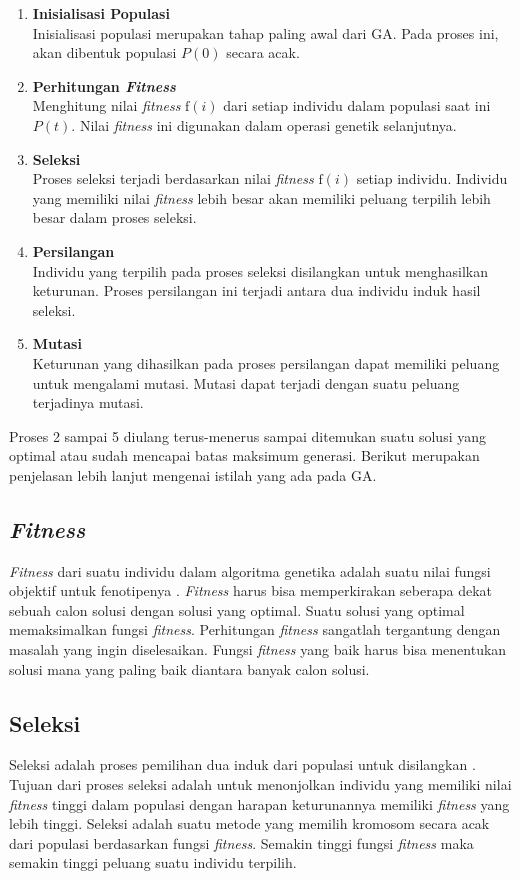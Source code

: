 \begin{enumerate}
	\item \textbf{Inisialisasi Populasi} \\
	Inisialisasi populasi merupakan tahap paling awal dari GA. Pada proses ini, akan dibentuk populasi $P(0)$ secara acak. 
	\item \textbf{Perhitungan \textit{Fitness}} \\
	Menghitung nilai \textit{fitness} $\textrm{f}(i)$ dari setiap individu dalam populasi saat ini $P(t)$. Nilai \textit{fitness} ini digunakan dalam operasi genetik selanjutnya.
	\item \textbf{Seleksi} \\
	Proses seleksi terjadi berdasarkan nilai \textit{fitness} $\textrm{f}(i)$ setiap individu. Individu yang memiliki nilai \textit{fitness} lebih besar akan memiliki peluang terpilih lebih besar dalam proses seleksi.
	\item \textbf{Persilangan} \\
	Individu yang terpilih pada proses seleksi disilangkan untuk menghasilkan keturunan. Proses persilangan ini terjadi antara dua individu induk hasil seleksi.
	\item \textbf{Mutasi} \\
	Keturunan yang dihasilkan pada proses persilangan dapat memiliki peluang untuk mengalami mutasi. Mutasi dapat terjadi dengan suatu peluang terjadinya mutasi.
\end{enumerate}

Proses 2 sampai 5 diulang terus-menerus sampai ditemukan suatu solusi yang optimal atau sudah mencapai batas maksimum generasi. Berikut merupakan penjelasan lebih lanjut mengenai istilah yang ada pada GA.

\subsection{\textit{Fitness}}
\label{sub:fitness}
\textit{Fitness} dari suatu individu dalam algoritma genetika adalah suatu nilai fungsi objektif untuk fenotipenya \cite{sivanandam2007introduction}. \textit{Fitness} harus bisa memperkirakan seberapa dekat sebuah calon solusi dengan solusi yang optimal. Suatu solusi yang optimal memaksimalkan fungsi \textit{fitness}. Perhitungan \textit{fitness} sangatlah tergantung dengan masalah yang ingin diselesaikan. Fungsi \textit{fitness} yang baik harus bisa menentukan solusi mana yang paling baik diantara banyak calon solusi.

\subsection{Seleksi}
\label{sub:selection}
Seleksi adalah proses pemilihan dua induk dari populasi untuk disilangkan \cite{sivanandam2007introduction}. Tujuan dari proses seleksi adalah untuk menonjolkan individu yang memiliki nilai \textit{fitness} tinggi dalam populasi dengan harapan keturunannya memiliki \textit{fitness} yang lebih tinggi. Seleksi adalah suatu metode yang memilih kromosom secara acak dari populasi berdasarkan fungsi \textit{fitness}. Semakin tinggi fungsi \textit{fitness} maka semakin tinggi peluang suatu individu terpilih. 

